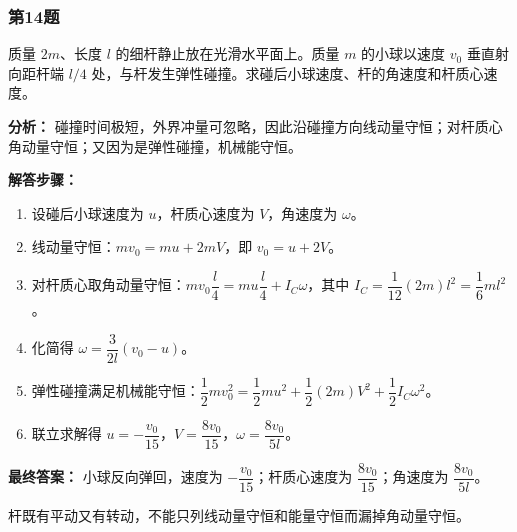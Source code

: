 \documentclass[12pt,a4paper]{ctexart}
\begin{document}
\subsubsection*{第14题}
\begin{tcolorbox}[colback=gray!2!white,colframe=black!60,title={题目}]
质量 \(2m\)、长度 \(l\) 的细杆静止放在光滑水平面上。质量 \(m\) 的小球以速度 \(v_0\) 垂直射向距杆端 \(l/4\) 处，与杆发生弹性碰撞。求碰后小球速度、杆的角速度和杆质心速度。\par
\end{tcolorbox}
\begin{tcolorbox}[colback=blue!2!white,colframe=blue!55!black,title={完整答案}]
\textbf{分析：}
碰撞时间极短，外界冲量可忽略，因此沿碰撞方向线动量守恒；对杆质心角动量守恒；又因为是弹性碰撞，机械能守恒。\par
\textbf{解答步骤：}
\begin{enumerate}
\item 设碰后小球速度为 \(u\)，杆质心速度为 \(V\)，角速度为 \(\omega\)。
\item 线动量守恒：\(mv_0=mu+2mV\)，即 \(v_0=u+2V\)。
\item 对杆质心取角动量守恒：\(mv_0\dfrac l4=mu\dfrac l4+I_C\omega\)，其中 \(I_C=\dfrac1{12}(2m)l^2=\dfrac16 ml^2\)。
\item 化简得 \(\omega=\dfrac{3}{2l}(v_0-u)\)。
\item 弹性碰撞满足机械能守恒：\(\dfrac12 mv_0^2=\dfrac12 mu^2+\dfrac12 (2m)V^2+\dfrac12 I_C\omega^2\)。
\item 联立求解得 \(u=-\dfrac{v_0}{15}\)，\(V=\dfrac{8v_0}{15}\)，\(\omega=\dfrac{8v_0}{5l}\)。
\end{enumerate}
\textbf{最终答案：}
小球反向弹回，速度为 \(-\dfrac{v_0}{15}\)；杆质心速度为 \(\dfrac{8v_0}{15}\)；角速度为 \(\dfrac{8v_0}{5l}\)。\par
\end{tcolorbox}
\begin{tcolorbox}[colback=red!2!white,colframe=red!55!black,title={易错点}]
杆既有平动又有转动，不能只列线动量守恒和能量守恒而漏掉角动量守恒。\par
\end{tcolorbox}
\end{document}
